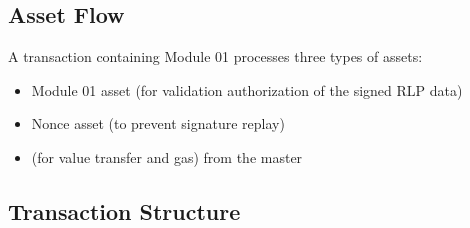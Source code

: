 \subsection{Asset Flow}
A transaction containing Module 01 processes three types of assets:
\begin{itemize}
    \item Module 01 asset (for validation authorization of the signed RLP data)
    \item Nonce asset (to prevent signature replay)
    \item {} (for value transfer and gas) from the master
\end{itemize}




\subsection{Transaction Structure}
